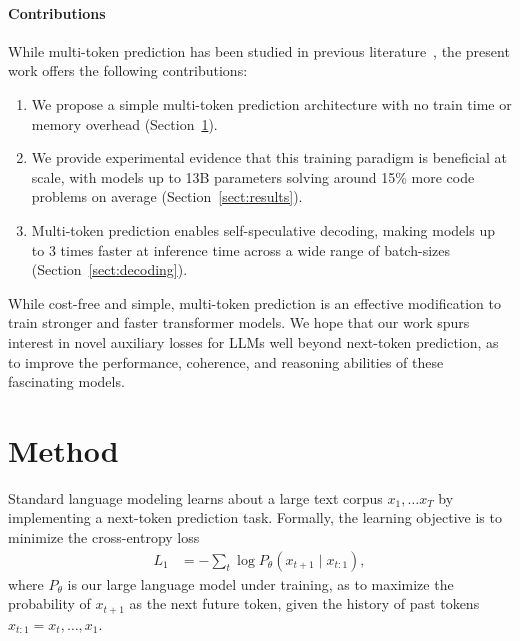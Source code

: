 \documentclass{article}
\theoremstyle{plain}
\theoremstyle{definition}
\theoremstyle{remark}
\begin{document}
\paragraph{Contributions}
While multi-token prediction has been studied in previous literature~\citep{qi2020prophetnet}, the present work offers the following contributions:
\begin{enumerate}
  \item We propose a simple multi-token prediction architecture with no train time or memory overhead (Section~\ref{sect:method}).
  \item We provide experimental evidence that this training paradigm is beneficial at scale, with models up to 13B parameters solving around 15\% more code problems on average (Section~\ref{sect:results}).
  \item Multi-token prediction enables self-speculative decoding, making models up to 3 times faster at inference time across a wide range of batch-sizes (Section~\ref{sect:decoding}).
\end{enumerate}

While cost-free and simple, multi-token prediction is an effective modification to train stronger and faster transformer models.
We hope that our work spurs interest in novel auxiliary losses for LLMs well beyond next-token prediction, as to improve the performance, coherence, and reasoning abilities of these fascinating models.

\section{Method}
\label{sect:method}
Standard language modeling learns about a large text corpus $x_1, \ldots x_T$ by implementing a next-token prediction task.
Formally, the learning objective is to minimize the cross-entropy loss
\begin{align}
     L_1
     &= - \sum_t \log P_\theta(x_{t+1} \mid x_{t:1}),
\end{align}
where $P_\theta$ is our large language model under training, as to maximize the probability of $x_{t+1}$ as the next future token, given the history of past tokens $x_{t:1} = x_{t}, \ldots, x_{1}$.
\end{document}
